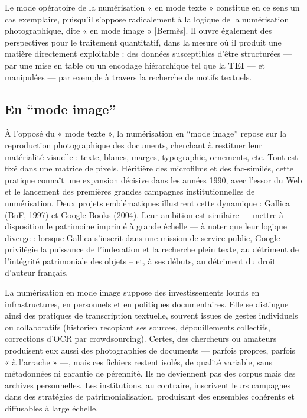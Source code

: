 Le mode opératoire de la numérisation « en mode texte » constitue en ce sens un cas exemplaire, puisqu’il s’oppose radicalement à la logique de la numérisation photographique, dite « en mode image » [Bermès]. Il ouvre également des perspectives pour le traitement quantitatif, dans la mesure où il produit une matière directement exploitable : des données susceptibles d’être structurées — par une mise en table ou un encodage hiérarchique tel que la \textbf{TEI} — et manipulées — par exemple à travers la recherche de motifs textuels.

\subsection{En \enquote{mode image}}

À l’opposé du « mode texte », la numérisation en \enquote{mode image} repose sur la reproduction photographique des documents, cherchant à restituer leur matérialité visuelle : texte, blancs, marges, typographie, ornements, etc. Tout est fixé dans une matrice de pixels. Héritière des microfilms et des fac-similés, cette pratique connaît une expansion décisive dans les années 1990, avec l’essor du Web et le lancement des premières grandes campagnes institutionnelles de numérisation. Deux projets emblématiques illustrent cette dynamique : Gallica (BnF, 1997) et Google Books (2004). Leur ambition est similaire — mettre à disposition le patrimoine imprimé à grande échelle — à noter que leur logique diverge : lorsque Gallica s’inscrit dans une mission de service public, Google privilégie la puissance de l’indexation et la recherche plein texte, au détriment de l’intégrité patrimoniale des objets -- et, à ses débuts, au détriment du droit d'auteur français.

La numérisation en mode image suppose des investissements lourds en infrastructures, en personnels et en politiques documentaires. Elle se distingue ainsi des pratiques de transcription textuelle, souvent issues de gestes individuels ou collaboratifs (historien recopiant ses sources, dépouillements collectifs, corrections d’OCR par crowdsourcing). Certes, des chercheurs ou amateurs produisent eux aussi des photographies de documents — parfois propres, parfois « à l’arrache » —, mais ces fichiers restent isolés, de qualité variable, sans métadonnées ni garantie de pérennité. Ils ne deviennent pas des corpus mais des archives personnelles. Les institutions, au contraire, inscrivent leurs campagnes dans des stratégies de patrimonialisation, produisant des ensembles cohérents et diffusables à large échelle.

